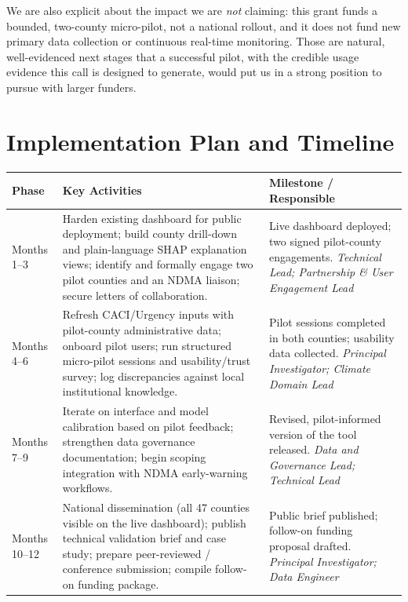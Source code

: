 \documentclass[12pt,a4paper]{article}
\begin{document}
We are also explicit about the impact we are \textit{not} claiming: this grant funds a bounded, two-county micro-pilot, not a national rollout, and it does not fund new primary data collection or continuous real-time monitoring. Those are natural, well-evidenced next stages that a successful pilot, with the credible usage evidence this call is designed to generate, would put us in a strong position to pursue with larger funders.

\newpage
\section{Implementation Plan and Timeline}

\begin{center}
\begin{tabular}{@{}p{2.0cm}p{7.6cm}p{5.8cm}@{}}
\toprule
\textbf{Phase} & \textbf{Key Activities} & \textbf{Milestone / Responsible} \\
\midrule
Months 1--3 &
Harden existing dashboard for public deployment; build county drill-down and plain-language SHAP explanation views; identify and formally engage two pilot counties and an NDMA liaison; secure letters of collaboration. &
Live dashboard deployed; two signed pilot-county engagements. \newline \textit{Technical Lead; Partnership \& User Engagement Lead} \\
\addlinespace
Months 4--6 &
Refresh CACI/Urgency inputs with pilot-county administrative data; onboard pilot users; run structured micro-pilot sessions and usability/trust survey; log discrepancies against local institutional knowledge. &
Pilot sessions completed in both counties; usability data collected. \newline \textit{Principal Investigator; Climate Domain Lead} \\
\addlinespace
Months 7--9 &
Iterate on interface and model calibration based on pilot feedback; strengthen data governance documentation; begin scoping integration with NDMA early-warning workflows. &
Revised, pilot-informed version of the tool released. \newline \textit{Data and Governance Lead; Technical Lead} \\
\addlinespace
Months 10--12 &
National dissemination (all 47 counties visible on the live dashboard); publish technical validation brief and case study; prepare peer-reviewed / conference submission; compile follow-on funding package. &
Public brief published; follow-on funding proposal drafted. \newline \textit{Principal Investigator; Data Engineer} \\
\bottomrule
\end{tabular}
\end{center}
\end{document}

